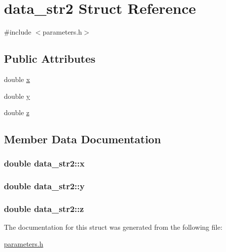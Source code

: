 \hypertarget{structdata__str2}{
\section{data\_\-str2 Struct Reference}
\label{structdata__str2}
}


{\ttfamily \#include $<$parameters.h$>$}

\subsection*{Public Attributes}
\begin{DoxyCompactItemize}
\item 
double \hyperlink{structdata__str2_a7cf08250d9c1a51c216909c41e5ce064}{x}
\item 
double \hyperlink{structdata__str2_aeb7d716eee702292fb3105a85934b850}{y}
\item 
double \hyperlink{structdata__str2_a643598c6cf6535fe1d58b8360d21538a}{z}
\end{DoxyCompactItemize}


\subsection{Member Data Documentation}
\hypertarget{structdata__str2_a7cf08250d9c1a51c216909c41e5ce064}{
\subsubsection[{x}]{\setlength{\rightskip}{0pt plus 5cm}double {\bf data\_\-str2::x}}}
\label{structdata__str2_a7cf08250d9c1a51c216909c41e5ce064}
\hypertarget{structdata__str2_aeb7d716eee702292fb3105a85934b850}{
\subsubsection[{y}]{\setlength{\rightskip}{0pt plus 5cm}double {\bf data\_\-str2::y}}}
\label{structdata__str2_aeb7d716eee702292fb3105a85934b850}
\hypertarget{structdata__str2_a643598c6cf6535fe1d58b8360d21538a}{
\subsubsection[{z}]{\setlength{\rightskip}{0pt plus 5cm}double {\bf data\_\-str2::z}}}
\label{structdata__str2_a643598c6cf6535fe1d58b8360d21538a}


The documentation for this struct was generated from the following file:\begin{DoxyCompactItemize}
\item 
\hyperlink{parameters_8h}{parameters.h}\end{DoxyCompactItemize}
